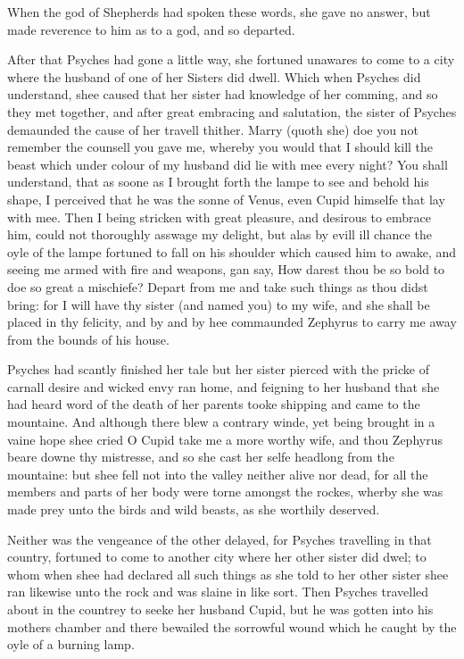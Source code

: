 When the god of Shepherds had spoken these words, she gave no answer, but made
reverence to him as to a god, and so departed.

After that Psyches had gone a little way, she fortuned unawares to come to a
city where the husband of one of her Sisters did dwell. Which when Psyches did
understand, shee caused that her sister had knowledge of her comming, and so
they met together, and after great embracing and salutation, the sister of
Psyches demaunded the cause of her travell thither. Marry (quoth she) doe you
not remember the counsell you gave me, whereby you would that I should kill the
beast which under colour of my husband did lie with mee every night? You shall
understand, that as soone as I brought forth the lampe to see and behold his
shape, I perceived that he was the sonne of Venus, even Cupid himselfe that lay
with mee. Then I being stricken with great pleasure, and desirous to embrace
him, could not thoroughly asswage my delight, but alas by evill ill chance the
oyle of the lampe fortuned to fall on his shoulder which caused him to awake,
and seeing me armed with fire and weapons, gan say, How darest thou be so bold
to doe so great a mischiefe? Depart from me and take such things as thou didst
bring: for I will have thy sister (and named you) to my wife, and she shall be
placed in thy felicity, and by and by hee commaunded Zephyrus to carry me away
from the bounds of his house.

Psyches had scantly finished her tale but her sister pierced with the pricke of
carnall desire and wicked envy ran home, and feigning to her husband that she
had heard word of the death of her parents tooke shipping and came to the
mountaine. And although there blew a contrary winde, yet being brought in a
vaine hope shee cried O Cupid take me a more worthy wife, and thou Zephyrus
beare downe thy mistresse, and so she cast her selfe headlong from the
mountaine: but shee fell not into the valley neither alive nor dead, for all
the members and parts of her body were torne amongst the rockes, wherby she was
made prey unto the birds and wild beasts, as she worthily deserved.

Neither was the vengeance of the other delayed, for Psyches travelling in that
country, fortuned to come to another city where her other sister did dwel; to
whom when shee had declared all such things as she told to her other sister
shee ran likewise unto the rock and was slaine in like sort. Then Psyches
travelled about in the countrey to seeke her husband Cupid, but he was gotten
into his mothers chamber and there bewailed the sorrowful wound which he caught
by the oyle of a burning lamp.

